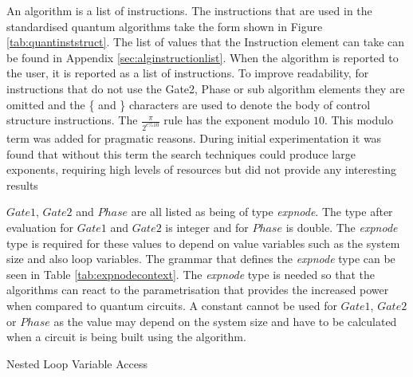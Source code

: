 An algorithm is a list of instructions.
The instructions that are used in the standardised quantum algorithms take the form shown in Figure \ref{tab:quantinststruct}.
The list of values that the Instruction element can take can be found in Appendix \ref{sec:alginstructionlist}.
When the algorithm is reported to the user, it is reported as a list of instructions.
To improve readability, for instructions that do not use the Gate2, Phase or sub algorithm elements they are omitted and the \{ and \} characters are used to denote the body of control structure instructions.
The $\frac{\pi}{2^{e\%10}}$ rule has the exponent modulo $10$.
This modulo term was added for pragmatic reasons.
During initial experimentation it was found that without this term the search techniques could produce large exponents, requiring high levels of resources but did not provide any interesting results

$Gate1$, $Gate2$ and $Phase$ are all listed as being of type \emph{expnode}.
The type after evaluation for $Gate1$ and $Gate2$ is integer and for $Phase$ is double.
The \emph{expnode} type is required for these values to depend on value variables such as the system size and also loop variables.
The grammar that defines the \emph{expnode} type can be seen in Table \ref{tab:expnodecontext}.
The \emph{expnode} type is needed so that the algorithms can react to the parametrisation that provides the increased power when compared to quantum circuits.
A constant cannot be used for $Gate1$, $Gate2$ or $Phase$ as the value may depend on the system size and have to be calculated when a circuit is being built using the algorithm.

\begin{algorithm}
\begin{algorithmic}
\STATE {}
\STATE {}
\ENDFOR
\ENDFOR
\end{algorithmic}
\caption{Nested Loop Variable Access}
\label{alg:nestloopvars}
\end{algorithm}


